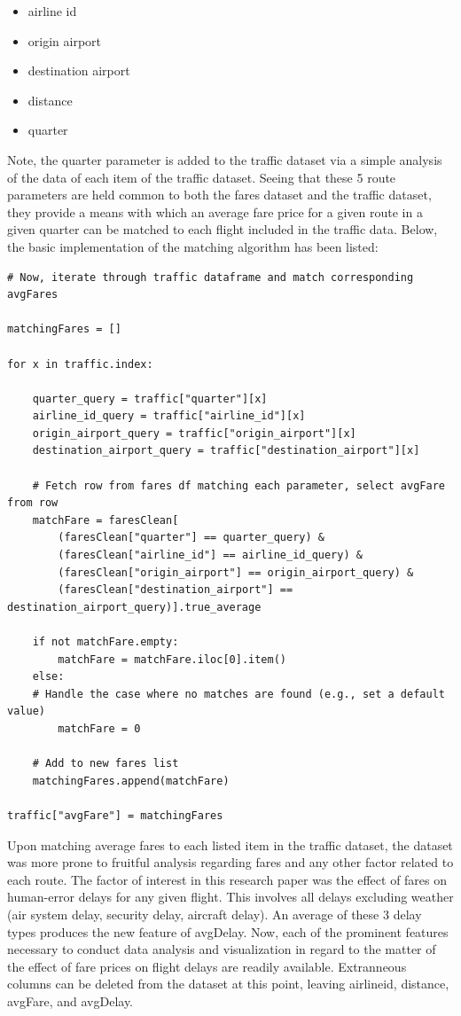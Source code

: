 \documentclass{article}
\begin{document}
\begin{itemize}
  \item airline id
  \item origin airport
  \item destination airport
  \item distance
  \item quarter
\end{itemize}

Note, the quarter parameter is added to the traffic dataset via a simple analysis of the data of each item of the traffic dataset. Seeing that these 5 route parameters are held common to both the fares dataset and the traffic dataset, they provide a means with which an average fare price for a given route in a given quarter can be matched to each flight included in the traffic data. Below, the basic implementation of the matching algorithm has been listed:

\begin{lstlisting}
# Now, iterate through traffic dataframe and match corresponding avgFares

matchingFares = []

for x in traffic.index:

    quarter_query = traffic["quarter"][x]
    airline_id_query = traffic["airline_id"][x]
    origin_airport_query = traffic["origin_airport"][x]
    destination_airport_query = traffic["destination_airport"][x]

    # Fetch row from fares df matching each parameter, select avgFare from row
    matchFare = faresClean[
        (faresClean["quarter"] == quarter_query) & 
        (faresClean["airline_id"] == airline_id_query) & 
        (faresClean["origin_airport"] == origin_airport_query) & 
        (faresClean["destination_airport"] == destination_airport_query)].true_average

    if not matchFare.empty:
        matchFare = matchFare.iloc[0].item()
    else:
    # Handle the case where no matches are found (e.g., set a default value)
        matchFare = 0
    
    # Add to new fares list
    matchingFares.append(matchFare)

traffic["avgFare"] = matchingFares
\end{lstlisting}

Upon matching average fares to each listed item in the traffic dataset, the dataset was more prone to fruitful analysis regarding fares and any other factor related to each route. The factor of interest in this research paper was the effect of fares on human-error delays for any given flight. This involves all delays excluding weather (air system delay, security delay, aircraft delay). An average of these 3 delay types produces the new feature of avgDelay. Now, each of the prominent features necessary to conduct data analysis and visualization in regard to the matter of the effect of fare prices on flight delays are readily available. Extranneous columns can be deleted from the dataset at this point, leaving airline\textunderscore id,  distance, avgFare, and avgDelay.
\end{document}

